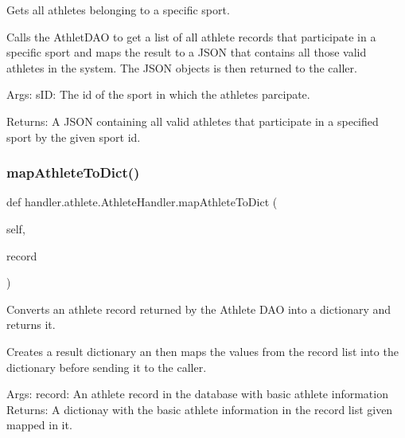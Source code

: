 \begin{DoxyVerb}Gets all athletes belonging to a specific sport.

Calls the AthletDAO to get a list of all athlete records
that participate in a specific sport and maps the result 
to a JSON that contains all those valid athletes in the 
system. The JSON objects is then returned to the caller.

Args:
    sID: The id of the sport in which the athletes parcipate.

Returns:
    A JSON containing all valid athletes that participate in a
    specified sport by the given sport id.
\end{DoxyVerb}
 \mbox{\label{classhandler_1_1athlete_1_1_athlete_handler_a953b9be16453dce8e25f08d2c53413f0}} 
\subsubsection{\texorpdfstring{map\+Athlete\+To\+Dict()}{mapAthleteToDict()}}
{\footnotesize\ttfamily def handler.\+athlete.\+Athlete\+Handler.\+map\+Athlete\+To\+Dict (\begin{DoxyParamCaption}\item[{}]{self,  }\item[{}]{record }\end{DoxyParamCaption})}

\begin{DoxyVerb}Converts an athlete record returned by the Athlete DAO into a dictionary 
and returns it.

Creates a result dictionary an then maps the values from the record 
list into the dictionary before sending it to the caller.

Args:
    record: An athlete record in the database with basic athlete information
Returns:
    A dictionay with the basic athlete information in the record list given
    mapped in it.
\end{DoxyVerb}
 \mbox{\label{classhandler_1_1athlete_1_1_athlete_handler_a53d7b2d7abc4fe899194f146763d3287}} 
